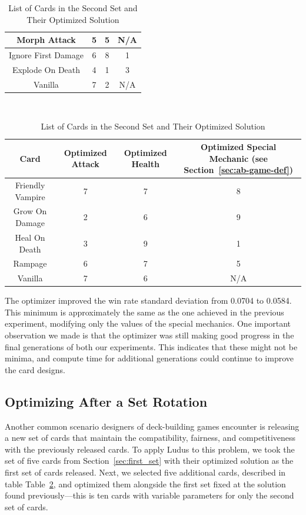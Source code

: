 \documentclass[letterpaper]{article} %
\begin{document}
\begin{table}[t]
\begin{tabular}{||c c c c||}
 \hline
 Morph Attack & 5 & 5 & N/A \\
 \hline
 Ignore First Damage & 6 & 8 & 1 \\
 \hline
 Explode On Death & 4 & 1 & 3 \\ 
 \hline
 Vanilla & 7 & 2 & N/A \\
 \hline
\end{tabular}
\caption{List of Cards in the First Set and Their Optimized Solution\label{tab:first_set}}
$ $\newline
\begin{tabular}{||c c c c||} 
 \hline
 Card & Optimized Attack & Optimized Health & Optimized Special Mechanic (see Section~\ref{sec:ab-game-def})\\ [0.5ex]
 \hline\hline
 Friendly Vampire & 7 & 7 & 8 \\
 \hline
 Grow On Damage & 2 & 6 & 9 \\
 \hline
 Heal On Death & 3 & 9 & 1 \\
 \hline
 Rampage & 6 & 7 & 5 \\ 
 \hline
 Vanilla & 7 & 6 & N/A \\
 \hline
\end{tabular}
\caption{List of Cards in the Second Set and Their Optimized Solution\label{tab:second_set}}
\end{table}


The optimizer improved the win rate standard deviation from 0.0704 to 0.0584. This minimum is approximately the same as the one achieved in the previous experiment, modifying only the values of the special mechanics. One important observation we made is that the optimizer was still making good progress in the final generations of both our experiments. This indicates that these might not be minima, %
and compute time for additional generations could continue to improve the card designs.


\subsection{Optimizing After a Set Rotation}

Another common scenario designers of deck-building games encounter is releasing a new set %
of cards that maintain the compatibility, fairness, and competitiveness with the previously released cards. %
To apply {\sc Ludus} to this problem, we took the set of five cards from Section~\ref{sec:first_set} with their optimized solution as %
the first set of cards released. Next, we selected five additional cards, described in table Table~\ref{tab:second_set}, and optimized them alongside %
the first set fixed at the solution found previously---this is ten cards with variable parameters for only the second set of cards. 
\end{document}
